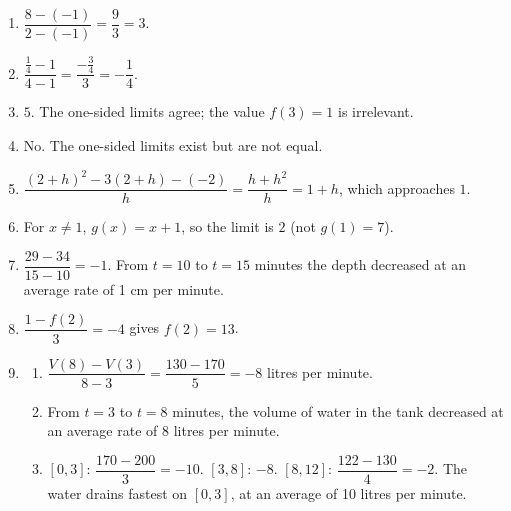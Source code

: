 \documentclass[11pt]{article}
\begin{document}
\newpage
\begin{solbox}
\begin{enumerate}[leftmargin=*,itemsep=4pt]
  \item $\dfrac{8-(-1)}{2-(-1)}=\dfrac93=3$.
  \item $\dfrac{\frac14-1}{4-1}=\dfrac{-\frac34}{3}=-\dfrac14$.
  \item $5$. The one-sided limits agree; the value $f(3)=1$ is irrelevant.
  \item No. The one-sided limits exist but are not equal.
  \item $\dfrac{(2+h)^2-3(2+h)-(-2)}{h}=\dfrac{h+h^2}{h}=1+h$, which approaches $1$.
  \item For $x\neq1$, $g(x)=x+1$, so the limit is $2$ (not $g(1)=7$).
  \item $\dfrac{29-34}{15-10}=-1$. From $t=10$ to $t=15$ minutes the depth decreased at an average rate of 1 cm per minute.
  \item $\dfrac{1-f(2)}{3}=-4$ gives $f(2)=13$.
  \item \begin{enumerate}[label=(\alph*),leftmargin=*,itemsep=3pt]
    \item $\dfrac{V(8)-V(3)}{8-3}=\dfrac{130-170}{5}=-8$ litres per minute.
    \item From $t=3$ to $t=8$ minutes, the volume of water in the tank decreased at an average rate of 8 litres per minute.
    \item $[0,3]$: $\dfrac{170-200}{3}=-10$. $[3,8]$: $-8$. $[8,12]$: $\dfrac{122-130}{4}=-2$. The water drains fastest on $[0,3]$, at an average of 10 litres per minute.
  \end{enumerate}
\end{enumerate}
\end{solbox}
\end{document}
